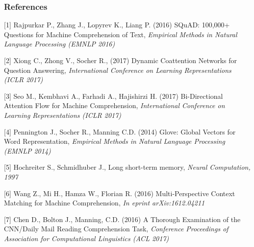 \documentclass{article} %
\begin{document}
\subsubsection*{References}
\small{
[1] Rajpurkar P., Zhang J., Lopyrev K., Liang P. (2016) SQuAD: 100,000+ Questions for Machine Comprehension of Text, {\it Empirical Methods in Natural Language Processing (EMNLP 2016)}

[2] Xiong C., Zhong V., Socher R., (2017) Dynamic Coattention Networks for Question Answering, {\it International Conference on Learning Representations (ICLR 2017)}

[3] Seo M., Kembhavi A., Farhadi A., Hajishirzi H. (2017) Bi-Directional Attention Flow for Machine Comprehension, {\it International Conference on Learning Representations (ICLR 2017)}

[4] Pennington J., Socher R., Manning C.D. (2014) Glove: Global Vectors for Word Representation, {\it Empirical Methods in Natural Language Processing (EMNLP 2014)}

[5] Hochreiter S., Schmidhuber J., Long short-term memory, {\it Neural Computation, 1997}

[6] Wang Z., Mi H., Hamza W., Florian R. (2016) Multi-Perspective Context Matching for Machine Comprehension, {\it In eprint arXiv:1612.04211}

[7] Chen D., Bolton J., Manning, C.D. (2016) A Thorough Examination of the
CNN/Daily Mail Reading Comprehension Task, {\it Conference Proceedings of Association for Computational Linguistics (ACL 2017)}
}
\end{document}
